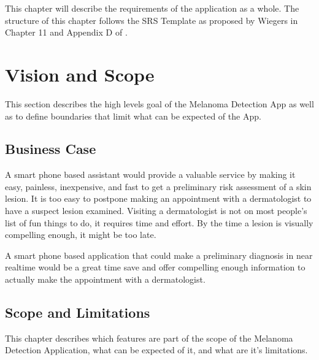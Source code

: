 This chapter will describe the requirements of the application as a whole. The structure of this chapter follows the SRS Template as proposed by Wiegers in Chapter 11 and Appendix D of \cite{wiegers2013software}.

\section{Vision and Scope}

    This section describes the high levels goal of the Melanoma Detection App as well as to define boundaries that limit what can be expected of the App.

    \subsection{Business Case}

        A smart phone based assistant would provide a valuable service by making it easy, painless, inexpensive, and fast to get a preliminary risk assessment of a skin lesion. It is too easy to postpone making an appointment with a dermatologist to have a suspect lesion examined. Visiting a dermatologist is not on most people’s list of fun things to do, it requires time and effort. By the time a lesion is visually compelling enough, it might be too late.

A smart phone based application that could make a preliminary diagnosis in near realtime would be a great time save and offer compelling enough information to actually make the appointment with a dermatologist.

    \subsection{Scope and Limitations}

    This chapter describes which features are part of the scope of the Melanoma Detection Application, what can be expected of it, and what are it's limitations.

